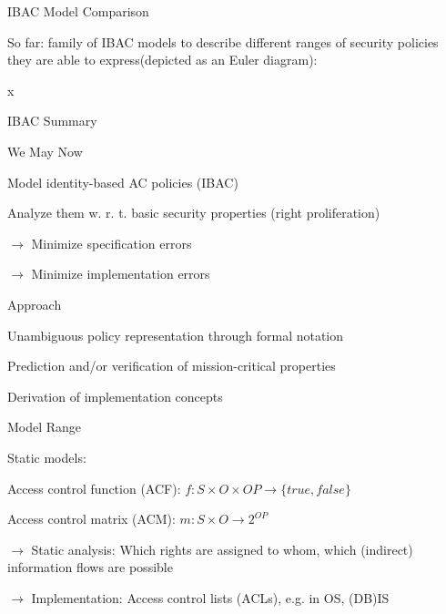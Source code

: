 \documentclass[a4paper]{article}
\begin{document}
\begin{multicols}{3}
    IBAC Model Comparison
    \begin{itemize*}
        \item So far: family of IBAC models to describe different ranges of security policies they are able to express(depicted as an Euler diagram):
        \item x%
    \end{itemize*}

    IBAC Summary
    \begin{itemize*}
        \item We May Now
              \begin{itemize*}
                  \item Model identity-based AC policies (IBAC)
                  \item Analyze them w. r. t. basic security properties (right proliferation)
                  \item $\rightarrow$  Minimize specification errors
                  \item $\rightarrow$  Minimize implementation errors
              \end{itemize*}
        \item Approach
              \begin{itemize*}
                  \item Unambiguous policy representation through formal notation
                  \item Prediction and/or verification of mission-critical properties
                  \item Derivation of implementation concepts
              \end{itemize*}
        \item Model Range
              \begin{itemize*}
                  \item Static models:
                        \begin{itemize*}
                            \item Access control function (ACF): $f:S\times O\times OP\rightarrow \{true,false\}$
                            \item Access control matrix (ACM): $m:S\times O\rightarrow 2^{OP}$
                            \item $\rightarrow$ Static analysis: Which rights are assigned to whom, which (indirect) information flows are possible
                            \item $\rightarrow$ Implementation: Access control lists (ACLs), e.g. in OS, (DB)IS

\end{itemize*}
\end{itemize*}
\end{itemize*}
\end{multicols}
\end{document}
